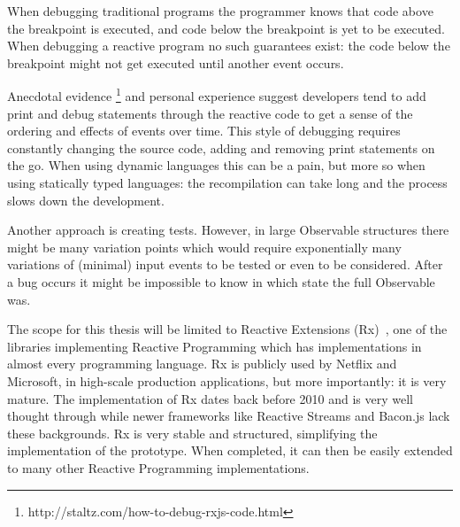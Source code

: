 When debugging traditional programs the programmer knows that code above
the breakpoint is executed, and code below the breakpoint is yet to be
executed.  When debugging a reactive program no such guarantees exist:
the code below the breakpoint might not get executed until another event
occurs.

Anecdotal evidence%
\footnote{http://staltz.com/how-to-debug-rxjs-code.html} and personal
experience suggest developers tend to add print and debug statements
through the reactive code to get a sense of the ordering and effects of
events over time.  This style of debugging requires constantly changing
the source code, adding and removing print statements on the go.  When
using dynamic languages this can be a pain, but more so when using
statically typed languages:  the recompilation can take long and the
process slows down the development.

Another approach is creating tests.  However, in large Observable
structures there might be many variation points which would require
exponentially many variations of (minimal) input events to be tested or
even to be considered.  After a bug occurs it might be impossible to
know in which state the full Observable was.



The scope for this thesis will be limited to Reactive Extensions (Rx)~\cite
{msdn_rx}, one of the libraries implementing Reactive Programming which
has implementations in almost every programming language.  Rx is
publicly used by Netflix and Microsoft, in high-scale production
applications, but more importantly:  it is very mature.  The
implementation of Rx dates back before 2010 and is very well thought
through while newer frameworks like Reactive Streams and Bacon.js lack
these backgrounds.  Rx is very stable and structured, simplifying the
implementation of the prototype.  When completed, it can then be easily
extended to many other Reactive Programming implementations.

